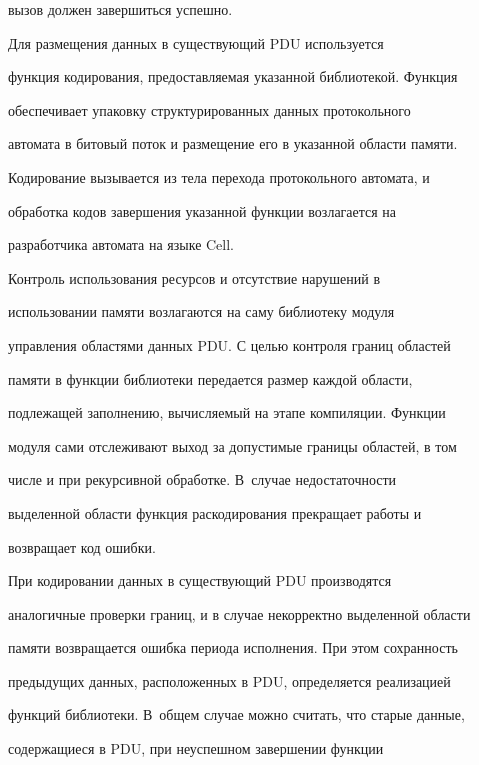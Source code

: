 вызов должен завершиться успешно.  


      


      Для размещения данных в существующий PDU используется 


функция кодирования, предоставляемая указанной библиотекой. Функция 


обеспечивает упаковку структурированных данных протокольного 


автомата в битовый поток и размещение его в указанной области памяти. 


Кодирование вызывается из тела перехода протокольного автомата, и 


обработка кодов завершения указанной функции возлагается на 


разработчика автомата на языке Cell. 


      


      Контроль использования ресурсов и отсутствие нарушений в 


использовании памяти возлагаются на саму библиотеку модуля 


управления областями данных PDU. С целью контроля границ областей 


памяти в функции библиотеки передается размер каждой области, 


подлежащей заполнению, вычисляемый на этапе компиляции. Функции 


модуля сами отслеживают выход за допустимые границы областей, в том 


числе и при рекурсивной обработке. В~случае недостаточности 


выделенной области функция раскодирования прекращает работы и 


возвращает код ошибки.


      


      При кодировании данных в существующий PDU производятся 


аналогичные проверки границ, и в случае некорректно выделенной области 


памяти возвращается ошибка периода исполнения. При этом сохранность 


предыдущих данных, расположенных в PDU, определяется реализацией 


функций библиотеки. В~общем случае можно считать, что старые данные, 


содержащиеся в PDU, при неуспешном завершении функции 


